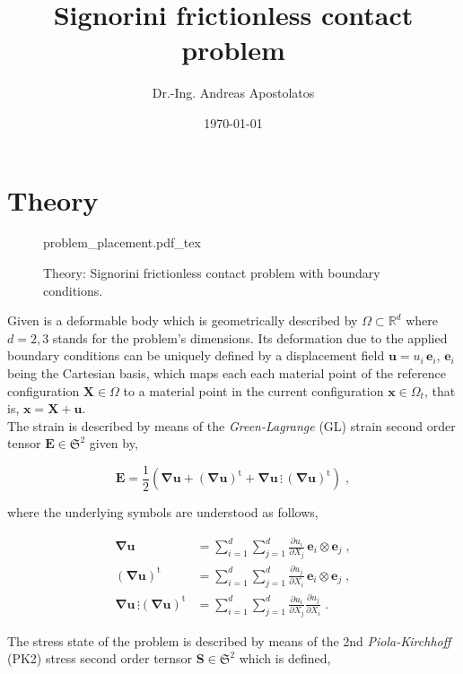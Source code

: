 \documentclass[10pt,a4paper]{article}
\title{Signorini frictionless contact problem}
\author{Dr.-Ing. Andreas Apostolatos}
\date{\today}
\begin{document}
\maketitle

\section{Theory}\label{sec:variational_formulation}

\begin{figure}[!h]
	\centering
	\footnotesize
    \def\svgwidth{0.5\textwidth}{problem_placement.pdf_tex}
	\caption{Theory: Signorini frictionless contact problem with boundary conditions.}
	\label{im:signorini_contact_problem}
\end{figure}

Given is a deformable body which is geometrically described by $\Omega \subset \mathbb{R}^d$ where $d = 2,3$ stands for the problem's dimensions. Its deformation due to the applied boundary conditions can be uniquely defined by a displacement field $\mathbf{u} = u_i \, \mathbf{e}_i$, $\mathbf{e}_i$ being the Cartesian basis, which maps each each material point of the reference configuration $\mathbf{X} \in \Omega$ to a material point in the current configuration $\mathbf{x} \in \Omega_t$, that is, $\mathbf{x} = \mathbf{X} + \mathbf{u}$.\\

The strain is described by means of the \textit{Green-Lagrange} (GL) strain second order tensor $\mathbf{E} \in \mathfrak{S}^2$ given by,

\begin{equation}
	\mathbf{E} = \frac{1}{2} \left( \boldsymbol{\nabla} \mathbf{u} + \left( \boldsymbol{\nabla} \mathbf{u} \right)^{\text{t}} +  \boldsymbol{\nabla} \mathbf{u} \, \vdots \, \left( \boldsymbol{\nabla} \mathbf{u} \right)^{\text{t}} \right) \;, \label{eq:GL_strain}
\end{equation}

where the underlying symbols are understood as follows,

\begin{subequations}
	\begin{alignat}{1}
		\boldsymbol{\nabla} \mathbf{u} &= \sum_{i = 1}^d \sum_{j = 1}^d \frac{\partial u_i}{\partial X_j} \, \mathbf{e}_i \otimes \mathbf{e}_j \;, \label{eq:nabla_u} \\
		\left( \boldsymbol{\nabla} \mathbf{u} \right)^{\text{t}} &= \sum_{i = 1}^d \sum_{j = 1}^d \frac{\partial u_j}{\partial X_i} \, \mathbf{e}_i \otimes \mathbf{e}_j \;, \label{eq:nabla_u_t} \\
		\boldsymbol{\nabla} \mathbf{u} \, \vdots \left( \boldsymbol{\nabla} \mathbf{u} \right)^{\text{t}} &= \sum_{i = 1}^d \sum_{j = 1}^d \frac{\partial u_i}{\partial X_j} \frac{\partial u_j}{\partial X_i} \;. \label{eq:nabla_u_times_u_t}
	\end{alignat}
\end{subequations}

The stress state of the problem is described by means of the 2nd \textit{Piola-Kirchhoff} (PK2) stress second order ternsor $\mathbf{S} \in \mathfrak{S}^2$ which is defined,
\end{document}
